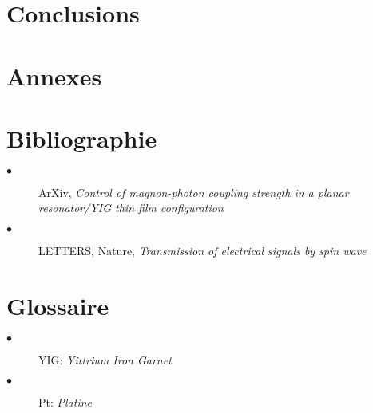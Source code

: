 \documentclass[12pt,fleqn]{book} %
\begin{document}
\part{Conclusions}

\setcounter{part}{-5}
\part{Annexes}

\setcounter{part}{-6}
\part{Bibliographie}
\label{Sources}
\appendix
\begin{description}
 \item[$\bullet$] ArXiv, \emph{Control of magnon-photon coupling strength in a planar resonator/YIG thin film configuration}
 \item[$\bullet$] LETTERS, Nature, \emph{Transmission of electrical signals by spin wave}
\end{description}

\setcounter{part}{-7}
\part{Glossaire}
\begin{description}
 \item[$\bullet$] YIG: \emph{Yittrium Iron Garnet}
 \item[$\bullet$] Pt: \emph{Platine}
\end{description}
\end{document}
